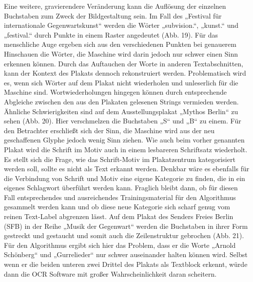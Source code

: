 \documentclass[a4paper,12pt,ngerman]{article}
\begin{document}
Eine weitere, gravierendere Veränderung kann die Auflösung der einzelnen Buchstaben zum Zweck der Bildgestaltung sein. Im Fall des „Festival für internationale Gegenwartskunst“ werden die Wörter „subvision.“, „kunst.“ und „festival.“ durch Punkte in einem Raster angedeutet (Abb. 19). Für das menschliche Auge ergeben sich aus den verschiedenen Punkten bei genauerem Hinschauen die Wörter, die Maschine wird darin jedoch nur schwer einen Sinn erkennen können. Durch das Auftauchen der Worte in anderen Textabschnitten, kann der Kontext des Plakats dennoch rekonstruiert werden. Problematisch wird es, wenn sich Wörter auf dem Plakat nicht wiederholen und unleserlich für die Maschine sind. Wortwiederholungen hingegen können durch entsprechende Abgleiche zwischen den aus den Plakaten gelesenen Strings vermieden werden. Ähnliche Schwierigkeiten sind auf dem Ausstellungsplakat „Mythos Berlin“ zu sehen (Abb. 20). Hier verschmelzen die Buchstaben „S“ und „B“ zu einem. Für den Betrachter erschließt sich der Sinn, die Maschine wird aus der neu geschaffenen Glyphe jedoch wenig Sinn ziehen. Wie auch beim vorher genannten Plakat wird die Schrift im Motiv auch in einem lesbareren Schriftsatz wiederholt. Es stellt sich die Frage, wie das Schrift-Motiv im Plakatzentrum kategorisiert werden soll, sollte es nicht als Text erkannt werden. Denkbar wäre es ebenfalls für die Verbindung von Schrift und Motiv eine eigene Kategorie zu finden, die in ein eigenes Schlagwort überführt werden kann. Fraglich bleibt dann, ob für diesen Fall entsprechendes und ausreichendes Trainingsmaterial für den Algorithmus gesammelt werden kann und ob diese neue Kategorie sich scharf genug vom reinen Text-Label abgrenzen lässt. Auf dem Plakat des Senders Freies Berlin (SFB) in der Reihe „Musik der Gegenwart“ werden die Buchstaben in ihrer Form gestreckt und gestaucht und somit auch die Zeilenstruktur gebrochen (Abb. 21). Für den Algorithmus ergibt sich hier das Problem, dass er die Worte „Arnold Schönberg“ und „Gurrelieder“ nur schwer auseinander halten können wird. Selbst wenn er die beiden unteren zwei Drittel des Plakats als Textblock erkennt, würde dann die OCR Software mit großer Wahrscheinlichkeit daran scheitern. \\
\end{document}
